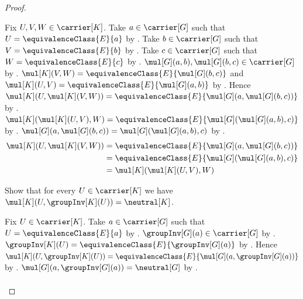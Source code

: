 \begin{proof}
\begin{subproof}
        Fix $U,V,W\in\carrier[K]$.
        Take $a\in\carrier[G]$ such that
            $U=\equivalenceClass{E}{a}$ by
            .
        Take $b\in\carrier[G]$ such that
            $V=\equivalenceClass{E}{b}$ by
            .
        Take $c\in\carrier[G]$ such that
            $W=\equivalenceClass{E}{c}$ by
            .
        $\mul[G](a,b),\mul[G](b,c)\in\carrier[G]$ by
            .
        $\mul[K](V,W)=\equivalenceClass{E}{\mul[G](b,c)}$ and
            $\mul[K](U,V)=\equivalenceClass{E}{\mul[G](a,b)}$ by
            .
        Hence
            $\mul[K](U,\mul[K](V,W))=
                \equivalenceClass{E}{\mul[G](a,\mul[G](b,c))}$ by
            .
        $\mul[K](\mul[K](U,V),W)=
            \equivalenceClass{E}{\mul[G](\mul[G](a,b),c)}$ by
            .
        $\mul[G](a,\mul[G](b,c))=
            \mul[G](\mul[G](a,b),c)$ by
            .
        \begin{align*}
            \mul[K](U,\mul[K](V,W))
                &= \equivalenceClass{E}{\mul[G](a,\mul[G](b,c))}
                \\
                &= \equivalenceClass{E}{\mul[G](\mul[G](a,b),c)}
                \\
                &= \mul[K](\mul[K](U,V),W)
        \end{align*}
    \end{subproof}
    Show that for every $U\in\carrier[K]$ we have
        $\mul[K](U,\groupInv[K](U))=\neutral[K]$.
    \begin{subproof}
        Fix $U\in\carrier[K]$.
        Take $a\in\carrier[G]$ such that
            $U=\equivalenceClass{E}{a}$ by
            .
        $\groupInv[G](a)\in\carrier[G]$ by
            .
        $\groupInv[K](U)=\equivalenceClass{E}{\groupInv[G](a)}$ by
            .
        Hence
            $\mul[K](U,\groupInv[K](U))=
                \equivalenceClass
                    {E}{\mul[G](a,\groupInv[G](a))}$ by
            .
        $\mul[G](a,\groupInv[G](a))=\neutral[G]$ by
            .
        \begin{align*}

\end{align*}
\end{subproof}
\end{proof}
